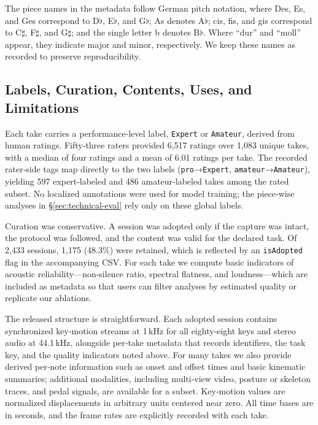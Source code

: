 \documentclass[sigconf,review,anonymous]{acmart}
\begin{document}
The piece names in the metadata follow German pitch notation, where Des, Es, and Ges correspond to D$\flat$, E$\flat$, and G$\flat$; As denotes A$\flat$; cis, fis, and gis correspond to C$\sharp$, F$\sharp$, and G$\sharp$; and the single letter b denotes B$\flat$. Where “dur” and “moll” appear, they indicate major and minor, respectively. We keep these names as recorded to preserve reproducibility.

\subsection{Labels, Curation, Contents, Uses, and Limitations}
\label{subsec:labels-content}
Each take carries a performance‑level label, \texttt{Expert} or \texttt{Amateur}, derived from human ratings. Fifty‑three raters provided 6{,}517 ratings over 1{,}083 unique takes, with a median of four ratings and a mean of 6.01 ratings per take. The recorded rater‑side tags map directly to the two labels (\texttt{pro}→\texttt{Expert}, \texttt{amateur}→\texttt{Amateur}), yielding 597 expert‑labeled and 486 amateur‑labeled takes among the rated subset. No localized annotations were used for model training; the piece‑wise analyses in §\ref{sec:technical-eval} rely only on these global labels.

Curation was conservative. A session was adopted only if the capture was intact, the protocol was followed, and the content was valid for the declared task. Of 2{,}433 sessions, 1{,}175 (48.3\%) were retained, which is reflected by an \texttt{isAdopted} flag in the accompanying CSV. For each take we compute basic indicators of acoustic reliability—non‑silence ratio, spectral flatness, and loudness—which are included as metadata so that users can filter analyses by estimated quality or replicate our ablations.

The released structure is straightforward. Each adopted session contains synchronized key‑motion streams at 1\,kHz for all eighty‑eight keys and stereo audio at 44.1\,kHz, alongside per‑take metadata that records identifiers, the task key, and the quality indicators noted above. For many takes we also provide derived per‑note information such as onset and offset times and basic kinematic summaries; additional modalities, including multi‑view video, posture or skeleton traces, and pedal signals, are available for a subset. Key‑motion values are normalized displacements in arbitrary units centered near zero. All time bases are in seconds, and the frame rates are explicitly recorded with each take.
\end{document}
